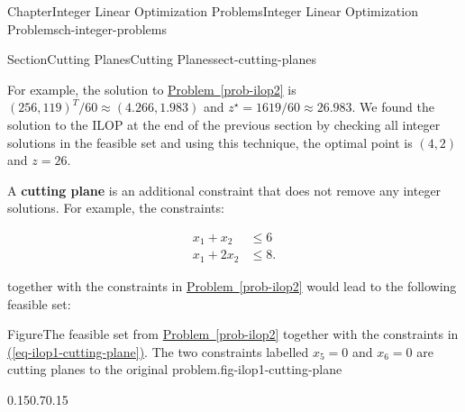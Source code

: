 \documentclass[oneside,10pt,]{book}
\newcommand{\xreffont}{\relax}
\newcommand{\terminology}[1]{\textbf{#1}}
\numberwithin{equation}{section}
\newcommand{\amp}{&}
\begin{document}
\begin{chapterptx}{Chapter}{Integer Linear Optimization Problems}{}{Integer Linear Optimization Problems}{}{}{ch-integer-problems}
\begin{sectionptx}{Section}{Cutting Planes}{}{Cutting Planes}{}{}{sect-cutting-planes}
\begin{introduction}{}
\par
For example, the solution to \hyperref[prob-ilop2]{Problem~{\xreffont\ref{prob-ilop2}}} is \((256,119)^{T}/60\approx (4.266,1.983)\) and \(z^{\star}=1619/60\approx 26.983\). We found the solution to the ILOP at the end of the previous section by checking all integer solutions in the feasible set and using this technique, the optimal point is \((4,2)\) and \(z=26\).%
\par
A \terminology{cutting plane} is an additional constraint that does not remove any integer solutions. For example, the constraints:%
\par
%
\begin{equation}
\begin{aligned} x_1 + x_2 \amp \leq 6 \\ x_1 +2x_2 \amp \leq 8.
\end{aligned}\label{eq-ilop1-cutting-plane}
\end{equation}
%
\par
together with the constraints in \hyperref[prob-ilop2]{Problem~{\xreffont\ref{prob-ilop2}}} would lead to the following feasible set:%
\begin{figureptx}{Figure}{The feasible set from \hyperref[prob-ilop2]{Problem~{\xreffont\ref{prob-ilop2}}} together with the constraints in \hyperref[eq-ilop1-cutting-plane]{({\xreffont\ref{eq-ilop1-cutting-plane}})}. The two constraints labelled \(x_5=0\) and \(x_6=0\) are cutting planes to the original problem.}{fig-ilop1-cutting-plane}{}%
\begin{image}{0.15}{0.7}{0.15}{}%
\end{image}
\end{figureptx}
\end{introduction}
\end{sectionptx}
\end{chapterptx}
\end{document}
